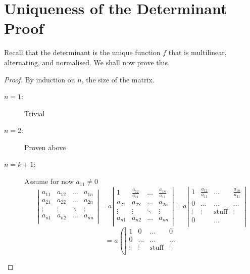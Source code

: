 \documentclass{article}
\theoremstyle{definition}
\begin{document}
\section{Uniqueness of the Determinant Proof}
Recall that the determinant is the unique function $f$ that is multilinear, alternating, and normalised. We shall now prove this.
\begin{proof}
	By induction on $n$, the size of the matrix.
	\begin{description}
		\item[$n=1$:] Trivial
		\item[$n=2$:] Proven above
		\item[$n=k+1$:] Assume for now $a_{11}\neq 0$
			\begin{equation*}
				\left|
					\begin{matrix}
						a_{11} & a_{12} & \dots & a_{1n} \\
						a_{21} & a_{22} & \dots & a_{2n} \\
						\vdots & \vdots & \ddots & \vdots \\
						a_{n1} & a_{n2} & \dots & a_{nn} \\
					\end{matrix}
				\right| = a\left|
					\begin{matrix}
						1 & \frac{a_{12}}{a_{11}} & \dots & \frac{a_{1n}}{a_{11}} \\
						a_{21} & a_{22} & \dots & a_{2n} \\
						\vdots & \vdots & \ddots & \vdots \\
						a_{n1} & a_{n2} & \dots & a_{nn} \\
					\end{matrix}
				\right| = a\left|
					\begin{matrix}
						1 & \frac{a_{12}}{a_{11}} & \dots & \frac{a_{1n}}{a_{11}} \\
						0 & \dots & \dots & \dots \\
						\vdots & \vdots & \text{stuff} & \vdots \\
						0 &  & \dots &  \\
					\end{matrix}
				\right|
			\end{equation*}
			\begin{equation*}
				= a\left(\left|
					\begin{matrix}
						1 & 0 & \dots & 0 \\
						0 & \dots & \dots & \dots \\
						\vdots & \vdots & \text{stuff} & \vdots \\

\end{matrix}
\end{equation*}
\end{description}
\end{proof}
\end{document}
